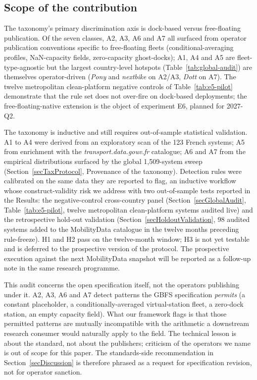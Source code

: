 \documentclass[11pt,a4paper]{article}
\begin{document}
\subsection{Scope of the contribution}
\label{secScope}
The taxonomy's primary discrimination axis is dock-based versus
free-floating publication. Of the seven classes, A2, A3, A6 and A7
all surfaced from operator publication conventions specific to
free-floating fleets (conditional-averaging profiles, NaN-capacity
fields, zero-capacity ghost-docks); A1, A4 and A5 are
fleet-type-agnostic but the largest country-level hotspots
(Table~\ref{tab:global-audit}) are themselves operator-driven (\emph{Pony}
and \emph{nextbike} on A2/A3, \emph{Dott} on A7). The twelve
metropolitan clean-platform negative controls of
Table~\ref{tab:e5-pilot} demonstrate that the rule set does not
over-fire on dock-based deployments; the free-floating-native
extension is the object of experiment E6, planned for 2027-Q2.

The taxonomy is inductive and still requires out-of-sample
statistical validation. A1 to A4 were derived from an exploratory scan of
the 123 French systems; A5 from enrichment with the
\emph{transport.data.gouv.fr} catalogue; A6 and A7 from the
empirical distributions surfaced by the global 1{,}509-system
sweep (Section~\ref{secTaxProtocol}, Provenance of the taxonomy).
Detection rules were calibrated on the same data they are reported
to flag, an inductive workflow whose construct-validity risk we
address with two out-of-sample tests reported in the Results:
the negative-control cross-country panel
(Section~\ref{secGlobalAudit}, Table~\ref{tab:e5-pilot}, twelve
metropolitan clean-platform systems audited live) and the
retrospective hold-out validation
(Section~\ref{secHoldoutValidation}, 98 audited systems added to
the MobilityData catalogue in the twelve months preceding
rule-freeze). H1 and H2 pass on the twelve-month window; H3 is
not yet testable and is deferred to the prospective version of
the protocol. The prospective execution against the next
MobilityData snapshot will be reported as a follow-up note in
the same research programme.

This audit concerns the open specification itself, not the operators
publishing under it. A2, A3, A6 and A7 detect patterns the GBFS
specification \emph{permits} (a constant placeholder, a
conditionally-averaged virtual-station fleet, a zero-dock
station, an empty capacity field). What our framework flags is
that those permitted patterns are mutually incompatible with the
arithmetic a downstream research consumer would naturally apply
to the field. The technical lesson is about the standard, not
about the publishers; criticism of the operators we name is out
of scope for this paper. The standards-side recommendation in
Section~\ref{secDiscussion} is therefore phrased as a request for
specification revision, not for operator sanction.
\end{document}
